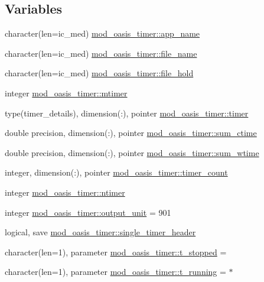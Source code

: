 \subsection*{Variables}
\begin{DoxyCompactItemize}
\item 
character(len=ic\+\_\+med) \hyperlink{namespacemod__oasis__timer_ad73dfe7213bbfab6212b9617000f4ce3}{mod\+\_\+oasis\+\_\+timer\+::app\+\_\+name}
\item 
character(len=ic\+\_\+med) \hyperlink{namespacemod__oasis__timer_a12dc3f95f8178d2ea46037a33da0e823}{mod\+\_\+oasis\+\_\+timer\+::file\+\_\+name}
\item 
character(len=ic\+\_\+med) \hyperlink{namespacemod__oasis__timer_a25a9f5f978c475475b48d782c4ad279c}{mod\+\_\+oasis\+\_\+timer\+::file\+\_\+hold}
\item 
integer \hyperlink{namespacemod__oasis__timer_acb04b78110e512ad551f7a500af70ef7}{mod\+\_\+oasis\+\_\+timer\+::mtimer}
\item 
type(timer\+\_\+details), dimension(\+:), pointer \hyperlink{namespacemod__oasis__timer_a8a4b64983bdf68b795ab2112bc02b8bc}{mod\+\_\+oasis\+\_\+timer\+::timer}
\item 
double precision, dimension(\+:), pointer \hyperlink{namespacemod__oasis__timer_a88e3c8171551da0ee64d10270484f6bf}{mod\+\_\+oasis\+\_\+timer\+::sum\+\_\+ctime}
\item 
double precision, dimension(\+:), pointer \hyperlink{namespacemod__oasis__timer_ab4d27b8be5c21939ab8d8e32d5582e9e}{mod\+\_\+oasis\+\_\+timer\+::sum\+\_\+wtime}
\item 
integer, dimension(\+:), pointer \hyperlink{namespacemod__oasis__timer_a225db1b2b8bd57f0567d37b5c4d00ca3}{mod\+\_\+oasis\+\_\+timer\+::timer\+\_\+count}
\item 
integer \hyperlink{namespacemod__oasis__timer_aa92116f5ed11fd498b11b37e368e7b72}{mod\+\_\+oasis\+\_\+timer\+::ntimer}
\item 
integer \hyperlink{namespacemod__oasis__timer_a80e0bc610eb9e9b0aa07e926d5a9fde8}{mod\+\_\+oasis\+\_\+timer\+::output\+\_\+unit} = 901
\item 
logical, save \hyperlink{namespacemod__oasis__timer_a3733877ab9fa9d07df0ff70f21cd08b0}{mod\+\_\+oasis\+\_\+timer\+::single\+\_\+timer\+\_\+header}
\item 
character(len=1), parameter \hyperlink{namespacemod__oasis__timer_aceca66a08f073eb12f2643edc7c400fe}{mod\+\_\+oasis\+\_\+timer\+::t\+\_\+stopped} = \textquotesingle{} \textquotesingle{}
\item 
character(len=1), parameter \hyperlink{namespacemod__oasis__timer_a110185cdca99e2889419692182b0440a}{mod\+\_\+oasis\+\_\+timer\+::t\+\_\+running} = \textquotesingle{}$\ast$\textquotesingle{}
\end{DoxyCompactItemize}
